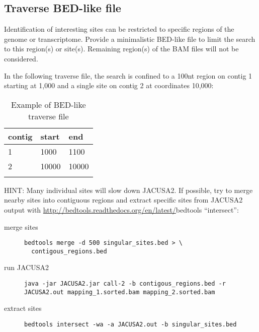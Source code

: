 \documentclass[10pt,a4paper,draft]{article}
\begin{document}
\subsection{Traverse BED-like file}
Identification of interesting sites can be restricted to specific regions of the genome or transcriptome. 
Provide a minimalistic BED-like file to limit the search to this region(s) or site(s). 
Remaining region(s) of the BAM files will not be considered.

In the following traverse file, the search is confined to a 100nt region on contig 1
starting at 1,000 and a single site on contig 2 at coordinates 10,000:
\begin{table}
\centering
\caption{Example of BED-like traverse file}
\label{tb:traverse_file}
\begin{tabular}{lll}
\textbf{contig} & \textbf{start} & \textbf{end} \\
\hline
1 & 1000 & 1100 \\
2 & 10000 & 10000 \\
\multicolumn{3}{c}{}
\end{tabular}
\end{table}

HINT: Many individual sites will slow down JACUSA2. If possible, try to merge nearby sites into
contiguous regions and extract specific sites from JACUSA2 output with \url{http://bedtools.readthedocs.org/en/latest/}{bedtools} 
``intersect'':
\begin{description}
\item[merge sites] \begin{verbatim} 
bedtools merge -d 500 singular_sites.bed > \ 
  contigous_regions.bed
\end{verbatim}

\item[run JACUSA2] \begin{verbatim} 
java -jar JACUSA2.jar call-2 -b contigous_regions.bed -r
JACUSA2.out mapping_1.sorted.bam mapping_2.sorted.bam
\end{verbatim}

\item[extract sites] \begin{verbatim}
bedtools intersect -wa -a JACUSA2.out -b singular_sites.bed
\end{verbatim}
\end{description}
\end{document}
